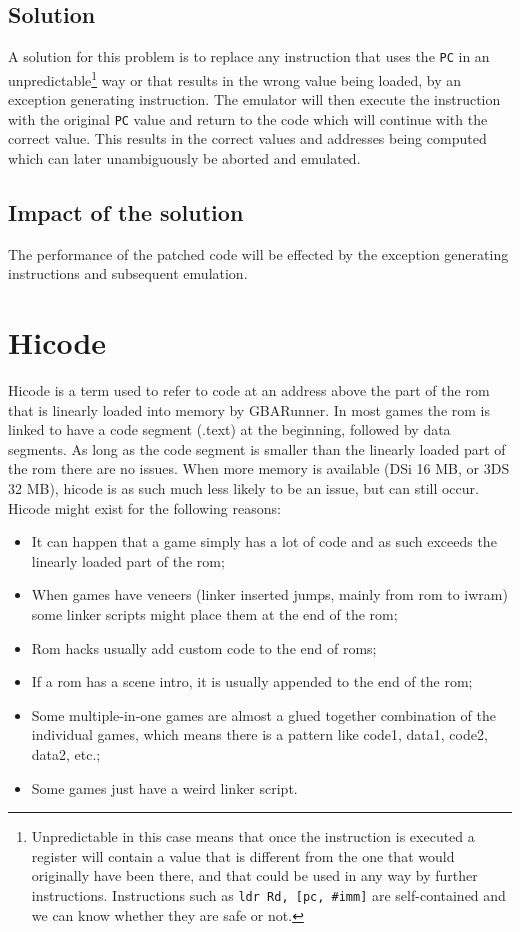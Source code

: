 \documentclass[a4paper,10pt]{report}
\begin{document}
	\subsection{Solution}
	A solution for this problem is to replace any instruction that uses the \texttt{PC} in an unpredictable\footnote{Unpredictable in this case means that once the instruction is executed a register will contain a value that is different from the one that would originally have been there, and that could be used in any way by further instructions. Instructions such as \texttt{ldr Rd, [pc, \#imm]} are self-contained and we can know whether they are safe or not.} way or that results in the wrong value being loaded, by an exception generating instruction. The emulator will then execute the instruction with the original \texttt{PC} value and return to the code which will continue with the correct value. This results in the correct values and addresses being computed which can later unambiguously be aborted and emulated.
	
	\subsection{Impact of the solution}
	The performance of the patched code will be effected by the exception generating instructions and subsequent emulation.
	
\section{Hicode}
	Hicode is a term used to refer to code at an address above the part of the rom that is linearly loaded into memory by GBARunner. In most games the rom is linked to have a code segment (.text) at the beginning, followed by data segments. As long as the code segment is smaller than the linearly loaded part of the rom there are no issues. When more memory is available (DSi 16 MB, or 3DS 32 MB), hicode is as such much less likely to be an issue, but can still occur. Hicode might exist for the following reasons:
	\begin{itemize}
		\item It can happen that a game simply has a lot of code and as such exceeds the linearly loaded part of the rom;
		\item When games have veneers (linker inserted jumps, mainly from rom to iwram) some linker scripts might place them at the end of the rom;
		\item Rom hacks usually add custom code to the end of roms;
		\item If a rom has a scene intro, it is usually appended to the end of the rom;
		\item Some multiple-in-one games are almost a glued together combination of the individual games, which means there is a pattern like code1, data1, code2, data2, etc.;
		\item Some games just have a weird linker script.
	\end{itemize}
\end{document}
